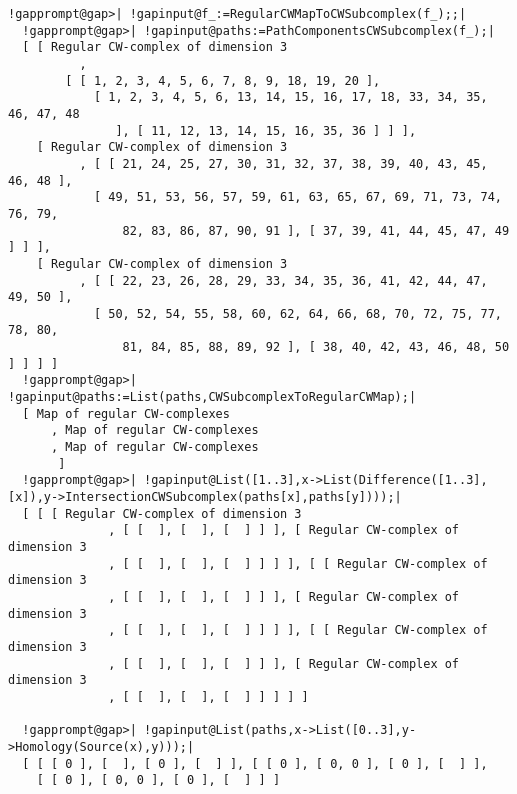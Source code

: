 \documentclass[a4paper,11pt]{report}
\begin{document}
{{\begin{Verbatim}[commandchars=!@|,fontsize=\small,frame=single,label=Example]
  !gapprompt@gap>| !gapinput@f_:=RegularCWMapToCWSubcomplex(f_);;|
  !gapprompt@gap>| !gapinput@paths:=PathComponentsCWSubcomplex(f_);|
  [ [ Regular CW-complex of dimension 3
          , 
        [ [ 1, 2, 3, 4, 5, 6, 7, 8, 9, 18, 19, 20 ], 
            [ 1, 2, 3, 4, 5, 6, 13, 14, 15, 16, 17, 18, 33, 34, 35, 46, 47, 48 
               ], [ 11, 12, 13, 14, 15, 16, 35, 36 ] ] ], 
    [ Regular CW-complex of dimension 3
          , [ [ 21, 24, 25, 27, 30, 31, 32, 37, 38, 39, 40, 43, 45, 46, 48 ], 
            [ 49, 51, 53, 56, 57, 59, 61, 63, 65, 67, 69, 71, 73, 74, 76, 79, 
                82, 83, 86, 87, 90, 91 ], [ 37, 39, 41, 44, 45, 47, 49 ] ] ], 
    [ Regular CW-complex of dimension 3
          , [ [ 22, 23, 26, 28, 29, 33, 34, 35, 36, 41, 42, 44, 47, 49, 50 ], 
            [ 50, 52, 54, 55, 58, 60, 62, 64, 66, 68, 70, 72, 75, 77, 78, 80, 
                81, 84, 85, 88, 89, 92 ], [ 38, 40, 42, 43, 46, 48, 50 ] ] ] ]
  !gapprompt@gap>| !gapinput@paths:=List(paths,CWSubcomplexToRegularCWMap);|
  [ Map of regular CW-complexes
      , Map of regular CW-complexes
      , Map of regular CW-complexes
       ]
  !gapprompt@gap>| !gapinput@List([1..3],x->List(Difference([1..3],[x]),y->IntersectionCWSubcomplex(paths[x],paths[y])));|
  [ [ [ Regular CW-complex of dimension 3
              , [ [  ], [  ], [  ] ] ], [ Regular CW-complex of dimension 3
              , [ [  ], [  ], [  ] ] ] ], [ [ Regular CW-complex of dimension 3
              , [ [  ], [  ], [  ] ] ], [ Regular CW-complex of dimension 3
              , [ [  ], [  ], [  ] ] ] ], [ [ Regular CW-complex of dimension 3
              , [ [  ], [  ], [  ] ] ], [ Regular CW-complex of dimension 3
              , [ [  ], [  ], [  ] ] ] ] ]
  
  !gapprompt@gap>| !gapinput@List(paths,x->List([0..3],y->Homology(Source(x),y)));|
  [ [ [ 0 ], [  ], [ 0 ], [  ] ], [ [ 0 ], [ 0, 0 ], [ 0 ], [  ] ], 
    [ [ 0 ], [ 0, 0 ], [ 0 ], [  ] ] ]
  

\end{Verbatim}}}
\end{document}
